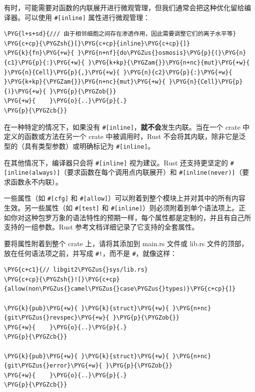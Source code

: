 有时，可能需要对函数的内联展开进行微观管理，但我们通常会把这种优化留给编译器。可以使用 \texttt{\#[inline]} 属性进行微观管理：

\begin{Verbatim}[commandchars=\\\{\},breaklines=true,breakanywhere=true,fontsize=\codefont,xleftmargin=17bp]
\PYG{l+s+sd}{/// 由于相邻细胞之间存在渗透作用，因此需要调整它们的离子水平等}
\PYG{c+cp}{\PYGZsh{}[}\PYG{c+cp}{inline}\PYG{c+cp}{]}
\PYG{k}{fn}\PYG{+w}{ }\PYG{n+nf}{do\PYGZus{}osmosis}\PYG{p}{(}\PYG{n}{c1}\PYG{p}{:}\PYG{+w}{ }\PYG{k+kp}{\PYGZam{}}\PYG{n+nc}{mut}\PYG{+w}{ }\PYG{n}{Cell}\PYG{p}{,}\PYG{+w}{ }\PYG{n}{c2}\PYG{p}{:}\PYG{+w}{ }\PYG{k+kp}{\PYGZam{}}\PYG{n+nc}{mut}\PYG{+w}{ }\PYG{n}{Cell}\PYG{p}{)}\PYG{+w}{ }\PYG{p}{\PYGZob{}}
\PYG{+w}{    }\PYG{o}{..}\PYG{p}{.}
\PYG{p}{\PYGZcb{}}
\end{Verbatim}

在一种特定的情况下，如果没有 \texttt{\#[inline]}，\textbf{就不会}发生内联。当在一个 crate 中定义的函数或方法在另一个 crate 中被调用时，Rust 不会将其内联，除非它是泛型的（具有类型参数）或明确标记为 \texttt{\#[inline]}。

在其他情况下，编译器只会将 \texttt{\#[inline]} 视为建议。Rust 还支持更坚定的 \texttt{\#[inline(always)]}（要求函数在每个调用点内联展开）和 \texttt{\#[inline(never)]}（要求函数永不内联）。

一些属性（如 \texttt{\#[cfg]} 和 \texttt{\#[allow]}）可以附着到整个模块上并对其中的所有内容生效。另一些属性（如 \texttt{\#[test]} 和 \texttt{\#[inline]}）则必须附着到单个语法项上。正如你对这种包罗万象的语法特性的预期一样，每个属性都是定制的，并且有自己所支持的一组参数。Rust 参考文档详细记录了它支持的全套属性。

要将属性附着到整个 crate 上，请将其添加到 main.rs 文件或 lib.rs 文件的顶部，放在任何语法项之前，并写成 \texttt{\#!}，而不是 \texttt{\#}，就像这样：

\begin{Verbatim}[commandchars=\\\{\},breaklines=true,breakanywhere=true,fontsize=\codefont,xleftmargin=17bp]
\PYG{c+c1}{// libgit2\PYGZus{}sys/lib.rs}
\PYG{c+cp}{\PYGZsh{}![}\PYG{c+cp}{allow(non\PYGZus{}camel\PYGZus{}case\PYGZus{}types)}\PYG{c+cp}{]}

\PYG{k}{pub}\PYG{+w}{ }\PYG{k}{struct}\PYG{+w}{ }\PYG{n+nc}{git\PYGZus{}revspec}\PYG{+w}{ }\PYG{p}{\PYGZob{}}
\PYG{+w}{    }\PYG{o}{..}\PYG{p}{.}
\PYG{p}{\PYGZcb{}}

\PYG{k}{pub}\PYG{+w}{ }\PYG{k}{struct}\PYG{+w}{ }\PYG{n+nc}{git\PYGZus{}error}\PYG{+w}{ }\PYG{p}{\PYGZob{}}
\PYG{+w}{    }\PYG{o}{..}\PYG{p}{.}
\PYG{p}{\PYGZcb{}}
\end{Verbatim}

